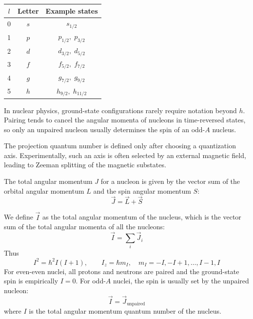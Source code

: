 \begin{center}
\begin{tabular}{c c c}
\toprule
$l$ & Letter & Example states \\
\midrule
0 & $s$ & $s_{1/2}$ \\
1 & $p$ & $p_{1/2},\; p_{3/2}$ \\
2 & $d$ & $d_{3/2},\; d_{5/2}$ \\
3 & $f$ & $f_{5/2},\; f_{7/2}$ \\
4 & $g$ & $g_{7/2},\; g_{9/2}$ \\
5 & $h$ & $h_{9/2},\; h_{11/2}$ \\
\bottomrule
\end{tabular}
\end{center}

In nuclear physics, ground-state configurations rarely require notation beyond $h$.  Pairing tends to cancel the angular momenta of nucleons in time-reversed states, so only an unpaired nucleon usually determines the spin of an odd-$A$ nucleus.

The projection quantum number is defined only after choosing a quantization axis.  Experimentally, such an axis is often selected by an external magnetic field, leading to Zeeman splitting of the magnetic substates.

The total angular momentum \(J\)  for a nucleon is given by the vector sum of the orbital angular momentum \(L\) and the spin angular momentum \(S\):
\begin{equation}\label{eq:angular_tot}
\vec{J} = \vec{L} + \vec{S}
\end{equation}

We define $\vec{I}$ as the total angular momentum of the nucleus, which is the vector sum of the total angular momenta of all the nucleons:
\begin{equation}\label{eq:angular_nucleus}
\vec{I} = \sum_{i} \vec{J}_i
\end{equation}
Thus
\[I^2 = \hbar^2 I(I+1),\qquad I_z = \hbar m_I, \quad m_I = -I, -I+1, \ldots, I-1, I\]
For even-even nuclei, all protons and neutrons are paired and the ground-state spin is empirically $I=0$.  For odd-$A$ nuclei, the spin is usually set by the unpaired nucleon:
\begin{equation}\label{eq:angular_odd}\vec{I} = \vec{J}_{\text{unpaired}}
\end{equation}
where \(I\) is the total angular momentum quantum number of the nucleus.


